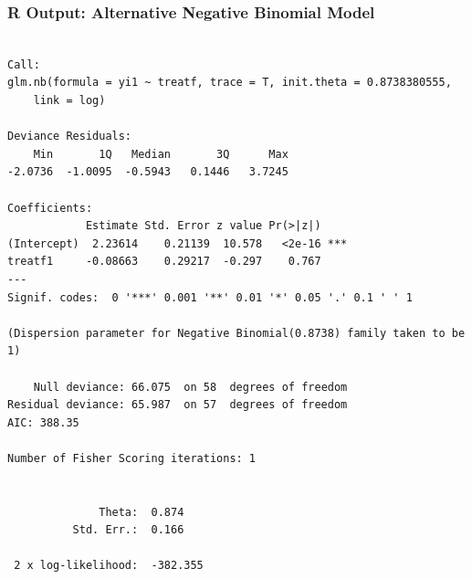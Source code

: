 \documentclass[oneside]{book}\usepackage[]{graphicx}\usepackage[svgnames]{xcolor}
\makeatletter
\newenvironment{kframe}{%
 \def\at@end@of@kframe{}%
 \ifinner\ifhmode%
  \def\at@end@of@kframe{\end{minipage}}%
  \begin{minipage}{\columnwidth}%
 \fi\fi%
 \def\FrameCommand##1{\hskip\@totalleftmargin \hskip-\fboxsep
 \colorbox{shadecolor}{##1}\hskip-\fboxsep
     \hskip-\linewidth \hskip-\@totalleftmargin \hskip\columnwidth}%
 \MakeFramed {\advance\hsize-\width
   \@totalleftmargin\z@ \linewidth\hsize
   \@setminipage}}%
 {\par\unskip\endMakeFramed%
 \at@end@of@kframe}
\newenvironment{knitrout}{}{} %
\makeatother
\begin{document}
\subsubsection*{R Output: Alternative Negative Binomial Model}
\begin{knitrout}
\color{fgcolor}\begin{kframe}
\begin{verbatim}

Call:
glm.nb(formula = yi1 ~ treatf, trace = T, init.theta = 0.8738380555, 
    link = log)

Deviance Residuals: 
    Min       1Q   Median       3Q      Max  
-2.0736  -1.0095  -0.5943   0.1446   3.7245  

Coefficients:
            Estimate Std. Error z value Pr(>|z|)    
(Intercept)  2.23614    0.21139  10.578   <2e-16 ***
treatf1     -0.08663    0.29217  -0.297    0.767    
---
Signif. codes:  0 '***' 0.001 '**' 0.01 '*' 0.05 '.' 0.1 ' ' 1

(Dispersion parameter for Negative Binomial(0.8738) family taken to be 1)

    Null deviance: 66.075  on 58  degrees of freedom
Residual deviance: 65.987  on 57  degrees of freedom
AIC: 388.35

Number of Fisher Scoring iterations: 1


              Theta:  0.874 
          Std. Err.:  0.166 

 2 x log-likelihood:  -382.355 
\end{verbatim}
\end{kframe}
\end{knitrout}
\end{document}
